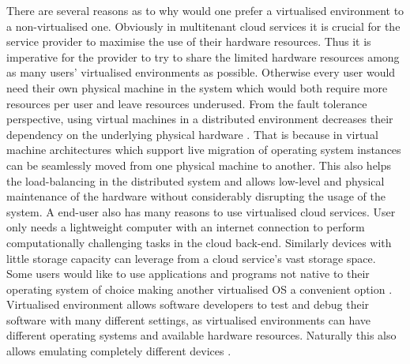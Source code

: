 There are several reasons as to why would one prefer a virtualised environment to a non-virtualised one. Obviously in multitenant cloud services it is crucial for the service provider to maximise the use of their hardware resources. Thus it is imperative for the provider to try to share the limited hardware resources among as many users' virtualised environments as possible. Otherwise every user would need their own physical machine in the system which would both require more resources per user and leave resources underused. From the fault tolerance perspective, using virtual machines in a distributed environment decreases their dependency on the underlying physical hardware \cite{Clark05livemigration}. That is because in virtual machine architectures which support live migration of operating system instances can be seamlessly moved from one physical machine to another. This also helps the load-balancing in the distributed system and allows low-level and physical maintenance of the hardware without considerably disrupting the usage of the system. A end-user also has many reasons to use virtualised cloud services. User only needs a lightweight computer with an internet connection to perform computationally challenging tasks in the cloud back-end. Similarly devices with little storage capacity can leverage from a cloud service's vast storage space. Some users would like to use applications and programs not native to their operating system of choice making another virtualised OS a convenient option \cite{ArpaciDusseau14-Book}. Virtualised environment allows software developers to test and debug their software with many different settings, as virtualised environments can have different operating systems and available hardware resources. Naturally this also allows emulating completely different devices \cite{eder2016hypervisor}.


	
